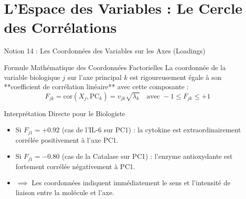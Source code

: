 \documentclass[aspectratio=169,10pt]{beamer}
\begin{document}
\section{L'Espace des Variables : Le Cercle des Corrélations}

\begin{frame}{Notion 14 : Les Coordonnées des Variables sur les Axes (Loadings)}
  \begin{conceptbox}{Formule Mathématique des Coordonnées Factorielles}
    \footnotesize
    La coordonnée de la variable biologique $j$ sur l'axe principal $k$ est rigoureusement égale à son **coefficient de corrélation linéaire** avec cette composante :
    \begin{equation*}
      F_{jk} = \text{cor}(X_j, \text{PC}_k) = v_{jk} \sqrt{\lambda_k} \quad \text{avec } -1 \le F_{jk} \le +1
    \end{equation*}
  \end{conceptbox}
  \vspace{1mm}
  \begin{biobox}{Interprétation Directe pour le Biologiste}
    \footnotesize
    \begin{itemize}
      \item Si $F_{j1} = +0.92$ (cas de l'IL-6 sur PC1) : la cytokine est extraordinairement corrélée positivement à l'axe PC1.
      \item Si $F_{j1} = -0.80$ (cas de la Catalase sur PC1) : l'enzyme antioxydante est fortement corrélée négativement à PC1.
      \item $\implies$ Les coordonnées indiquent immédiatement le sens et l'intensité de liaison entre la molécule et l'axe.
    \end{itemize}
  \end{biobox}
\end{frame}
\end{document}
